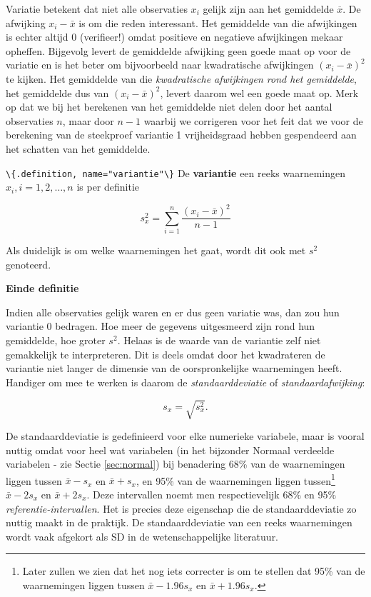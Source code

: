 \documentclass[
  12pt,dutch,coursenotes]{book}
\newcommand{\passthrough}[1]{#1}
\begin{document}
Variatie betekent dat niet alle observaties \(x_i\) gelijk zijn aan het
gemiddelde \(\overline{x}\). De afwijking \(x_i - \bar{x}\) is om die reden
interessant. Het gemiddelde van die afwijkingen is echter altijd 0
(verifieer!) omdat positieve en negatieve afwijkingen mekaar opheffen.
Bijgevolg levert de gemiddelde afwijking geen goede maat op voor de variatie
en is het beter om bijvoorbeeld naar kwadratische afwijkingen \((x_i - \bar{x})^2\) te kijken. Het gemiddelde van die \emph{kwadratische afwijkingen rond het gemiddelde}, het gemiddelde dus van \((x_i - \bar{x})^2\), levert daarom
wel een goede maat op. Merk op dat we bij het berekenen van het gemiddelde niet delen door het aantal observaties \(n\), maar door \(n-1\) waarbij we corrigeren voor het feit dat we voor de berekening van de steekproef variantie 1 vrijheidsgraad hebben gespendeerd aan het schatten van het gemiddelde.

\passthrough{\lstinline!\{.definition, name="variantie"\}!}
De \textbf{variantie} een reeks waarnemingen \(x_i, i=1, 2, \dots, n\) is per
definitie

\begin{equation*}
s^2_x = \sum_{i=1}^{n} \frac{(x_i - \bar{x})^2}{n-1}
\end{equation*}

Als duidelijk is om welke waarnemingen het gaat, wordt dit ook met \(s^2\)
genoteerd.

\textbf{Einde definitie}

Indien alle observaties gelijk waren en er dus geen variatie was, dan zou
hun variantie 0 bedragen. Hoe meer de gegevens uitgesmeerd zijn rond hun
gemiddelde, hoe groter \(s^2\). Helaas is de waarde van de variantie zelf niet
gemakkelijk te interpreteren. Dit is deels omdat door het kwadrateren de
variantie niet langer de dimensie van de oorspronkelijke waarnemingen heeft.
Handiger om mee te werken is daarom de \emph{standaarddeviatie} of \emph{
standaardafwijking}:

\begin{equation*}
s_x= \sqrt{s_x^2} .
\end{equation*}

De standaarddeviatie is gedefinieerd voor elke numerieke variabele, maar is
vooral nuttig omdat voor heel wat variabelen (in het bijzonder Normaal
verdeelde variabelen - zie Sectie \ref{sec:normal}) bij benadering 68\% van
de waarnemingen liggen tussen \(\bar{x} - s_x\) en \(\bar{x} + s_x\), en 95\%
van de waarnemingen liggen tussen\footnote{Later zullen we zien dat het nog iets correcter is om te stellen dat 95\% van de waarnemingen liggen tussen \(\bar{x} - 1.96 s_x\) en \(\bar{x} + 1.96 s_x\).}
\(\bar{x} - 2 s_x\) en \(\bar{x} + 2 s_x\). Deze intervallen noemt men respectievelijk 68\% en 95\% \emph{referentie-intervallen}. Het is precies deze eigenschap die de
standaarddeviatie zo nuttig maakt in de praktijk. De standaarddeviatie van
een reeks waarnemingen wordt vaak afgekort als SD in de wetenschappelijke literatuur.
\end{document}

